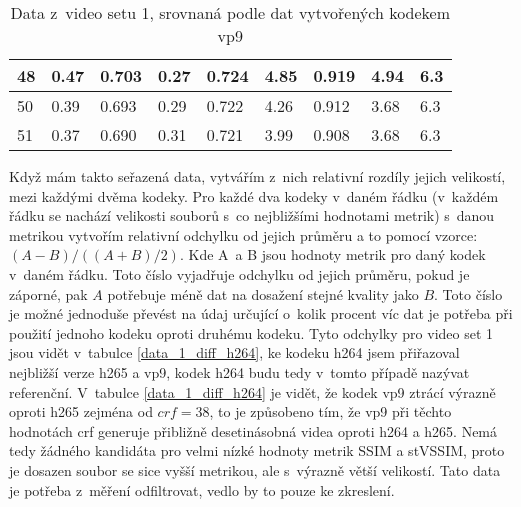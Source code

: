 \documentclass[thesis=M,czech]{FITthesis}[2016/06/26]
\begin{document}
\begin{table}[]
\begin{tabular}{|p{.3cm}|p{}|p{1cm}|p{}|p{}|p{0.95cm}|p{0.95cm}|p{1.45cm}|p{1.45cm}|}
48  & 0.47       & 0.703 & 0.27   & 0.724 & 4.85       & 0.919 & 4.94                                                                  & 6.3                                                                   \\ \hline
50  & 0.39       & 0.693 & 0.29   & 0.722 & 4.26       & 0.912 & 3.68                                                                  & 6.3                                                                   \\ \hline
51  & 0.37       & 0.690 & 0.31   & 0.721 & 3.99       & 0.908 & 3.68                                                                  & 6.3                                                                   \\ \hline
\end{tabular}
\caption{Data z~video setu 1, srovnaná podle dat vytvořených kodekem vp9}
\label{data1_fit_VP9}
\end{table}

Když mám takto seřazená data, vytvářím z~nich relativní rozdíly jejich velikostí, mezi každými dvěma kodeky. Pro každé dva kodeky v~daném řádku (v~každém řádku se nachází velikosti souborů s~co nejbližšími hodnotami metrik) s~danou metrikou vytvořím relativní odchylku od jejich průměru a to pomocí vzorce: $(A-B)/((A+B)/2)$.
Kde A~a B jsou hodnoty metrik pro daný kodek v~daném řádku. Toto číslo vyjadřuje odchylku od jejich průměru, pokud je záporné, pak $A$ potřebuje méně dat na dosažení stejné kvality jako $B$. Toto číslo je možné jednoduše převést na údaj určující o~kolik procent víc dat je potřeba při použití jednoho kodeku oproti druhému kodeku. Tyto odchylky pro video set 1 jsou vidět v~tabulce \ref{data_1_diff_h264}, ke kodeku h264 jsem přiřazoval nejbližší verze h265 a vp9, kodek h264 budu tedy v~tomto případě nazývat referenční. V~tabulce \ref{data_1_diff_h264} je vidět, že kodek vp9 ztrácí výrazně oproti h265 zejména od $crf=38$, to je způsobeno tím, že vp9 při těchto hodnotách crf generuje přibližně desetinásobná videa oproti h264 a h265. Nemá tedy žádného kandidáta pro velmi nízké hodnoty metrik SSIM a stVSSIM, proto je dosazen soubor se sice vyšší metrikou, ale s~výrazně větší velikostí. Tato data je potřeba z~měření odfiltrovat, vedlo by to pouze ke zkreslení.  
\end{document}
